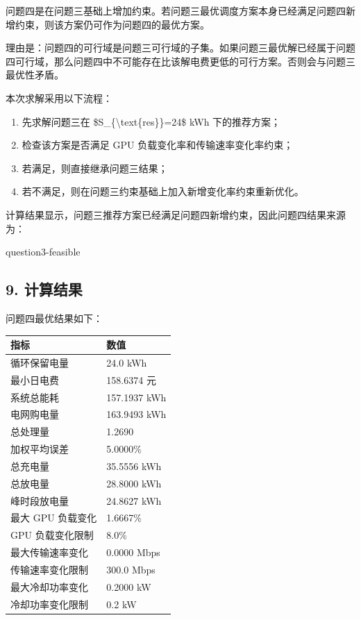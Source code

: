 \documentclass[
]{article}
\newenvironment{Shaded}{}{}
\newcommand{\NormalTok}[1]{#1}
\begin{document}
问题四是在问题三基础上增加约束。若问题三最优调度方案本身已经满足问题四新增约束，则该方案仍可作为问题四的最优方案。

理由是：问题四的可行域是问题三可行域的子集。如果问题三最优解已经属于问题四可行域，那么问题四中不可能存在比该解电费更低的可行方案。否则会与问题三最优性矛盾。

本次求解采用以下流程：

\begin{enumerate}
\def\labelenumi{\arabic{enumi}.}
\item
  先求解问题三在 \$S\_\{\textbackslash text\{res\}\}=24\$ kWh
  下的推荐方案；
\item
  检查该方案是否满足 GPU 负载变化率和传输速率变化率约束；
\item
  若满足，则直接继承问题三结果；
\item
  若不满足，则在问题三约束基础上加入新增变化率约束重新优化。
\end{enumerate}

计算结果显示，问题三推荐方案已经满足问题四新增约束，因此问题四结果来源为：

\begin{Shaded}
\begin{Highlighting}[]
\NormalTok{question3{-}feasible}
\end{Highlighting}
\end{Shaded}

\subsection{9. 计算结果}\label{9-ux8ba1ux7b97ux7ed3ux679c}

问题四最优结果如下：

\begin{longtable}[]{@{}ll@{}}
\toprule\noalign{}
指标 & 数值 \\
\midrule\noalign{}
\endhead
\bottomrule\noalign{}
\endlastfoot
循环保留电量 & 24.0 kWh \\
最小日电费 & 158.6374 元 \\
系统总能耗 & 157.1937 kWh \\
电网购电量 & 163.9493 kWh \\
总处理量 & 1.2690 \\
加权平均误差 & 5.0000\% \\
总充电量 & 35.5556 kWh \\
总放电量 & 28.8000 kWh \\
峰时段放电量 & 24.8627 kWh \\
最大 GPU 负载变化 & 1.6667\% \\
GPU 负载变化限制 & 8.0\% \\
最大传输速率变化 & 0.0000 Mbps \\
传输速率变化限制 & 300.0 Mbps \\
最大冷却功率变化 & 0.2000 kW \\
冷却功率变化限制 & 0.2 kW \\
\end{longtable}
\end{document}

